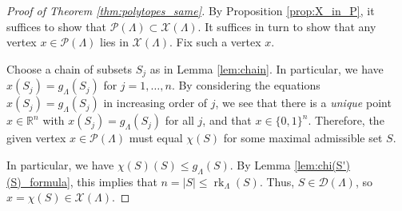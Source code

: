 \documentclass[12pt]{amsart}
\DeclareMathOperator{\rk}{rk}
\newcommand{\cD}{\mathcal{D}}
\newcommand{\cP}{\mathcal{P}}
\newcommand{\bR}{\mathbb{R}}
\newcommand{\cX}{\mathcal{X}}
\begin{document}
\begin{proof}[Proof of Theorem \ref{thm:polytopes_same}]
    By Proposition \ref{prop:X_in_P}, it suffices to show that $\cP(\Lambda)\subset\cX(\Lambda)$. It suffices in turn to show that any vertex $x \in \cP(\Lambda)$ lies in $\cX(\Lambda)$. Fix such a vertex $x$.

    Choose a chain of subsets $S_j$ as in Lemma \ref{lem:chain}. In particular, we have $x(S_j)=g_\Lambda(S_j)$ for $j=1,\ldots,n$. By considering the equations $x(S_j)=g_\Lambda(S_j)$ in increasing order of $j$, we see that there is a \emph{unique} point $x\in\bR^n$ with $x(S_j)=g_\Lambda(S_j)$ for all $j$, and that $x\in\{0,1\}^n$. Therefore, the given vertex $x \in \cP(\Lambda)$ must equal $\chi(S)$ for some maximal admissible set $S$. 

    In particular, we have $\chi(S)(S)\le g_{\Lambda}(S)$. By Lemma \ref{lem:chi(S')(S)_formula}, this implies that $n=|S|\le \rk_\Lambda(S)$. Thus, $S\in\cD(\Lambda)$, so $x=\chi(S)\in \cX(\Lambda)$.
\end{proof}

 

\end{document}
